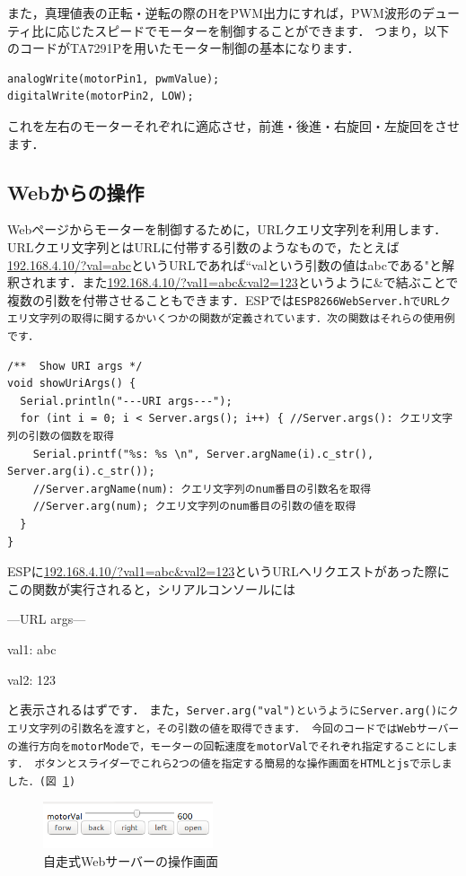 また，真理値表の正転・逆転の際のHをPWM出力にすれば，PWM波形のデューティ比に応じたスピードでモーターを制御することができます．
つまり，以下のコードがTA7291Pを用いたモーター制御の基本になります．
\begin{verbatim}
analogWrite(motorPin1, pwmValue);
digitalWrite(motorPin2, LOW);
\end{verbatim}
これを左右のモーターそれぞれに適応させ，前進・後進・右旋回・左旋回をさせます．

\subsection{Webからの操作}
Webページからモーターを制御するために，URLクエリ文字列を利用します．URLクエリ文字列とはURLに付帯する引数のようなもので，たとえば\url{192.168.4.10/?val=abc}というURLであれば``valという引数の値はabcである"と解釈されます．また\url{192.168.4.10/?val1=abc&val2=123}というように\&で結ぶことで複数の引数を付帯させることもできます．ESPでは\tt{ESP8266WebServer.h}\rm{}でURLクエリ文字列の取得に関するかいくつかの関数が定義されています．次の関数はそれらの使用例です．
\begin{verbatim}
/**  Show URI args */
void showUriArgs() {
  Serial.println("---URI args---");
  for (int i = 0; i < Server.args(); i++) { //Server.args(): クエリ文字列の引数の個数を取得
    Serial.printf("%s: %s \n", Server.argName(i).c_str(), Server.arg(i).c_str()); 
    //Server.argName(num): クエリ文字列のnum番目の引数名を取得
    //Server.arg(num); クエリ文字列のnum番目の引数の値を取得
  }
}
\end{verbatim}
ESPに\url{192.168.4.10/?val1=abc&val2=123}というURLへリクエストがあった際にこの関数が実行されると，シリアルコンソールには
\tt{

---URL args---

val1: abc

val2: 123

}\rm{}
\noindent
と表示されるはずです．
また，\tt{Server.arg("val")}\rm{}というように\tt{Server.arg()}\rm{}にクエリ文字列の引数名を渡すと，その引数の値を取得できます．
今回のコードではWebサーバーの進行方向をmotorModeで，モーターの回転速度をmotorValでそれぞれ指定することにします．
ボタンとスライダーでこれら2つの値を指定する簡易的な操作画面をHTMLとjsで示しました．(図 \ref{fig:html})

\begin{figure}[htbp]
    \centering
    \includegraphics[width=50mm]{./assets/haibaraaaaaaaasset/motorCtr.png}
    \caption{自走式Webサーバーの操作画面}
    \label{fig:html}
\end{figure}

